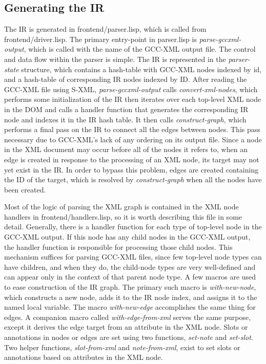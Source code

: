 \documentclass[12pt]{article}
\begin{document}
\subsection{Generating the IR}
The IR is generated in frontend/parser.lisp, which is called from frontend/driver.lisp. The primary entry-point in parser.lisp is \emph{parse-gccxml-output}, which is called with the name of the GCC-XML output file. The control and data flow within the parser is simple. The IR is represented in the \emph{parser-state} structure, which contains a hash-table with GCC-XML nodes indexed by id, and a hash-table of corresponding IR nodes indexed by ID. After reading the GCC-XML file using S-XML, \emph{parse-gccxml-output} calls \emph{convert-xml-nodes}, which performs some initialization of the IR then iterates over each top-level XML node in the DOM and calls a handler function that generates the corresponding IR node and indexes it in the IR hash table. It then calls \emph{construct-graph}, which performs a final pass on the IR to connect all the edges between nodes. This pass necessary due to GCC-XML's lack of any ordering on its output file. Since a node in the XML document may occur before all of the nodes it refers to, when an edge is created in response to the processing of an XML node, its target may not yet exist in the IR. In order to bypass this problem, edges are created containing the ID of the target, which is resolved by \emph{construct-graph} when all the nodes have been created. 

Most of the logic of parsing the XML graph is contained in the XML node handlers in  frontend/handlers.lisp, so it is worth describing this file in some detail. Generally, there is a handler function for each type of top-level node in the GCC-XML output. If this node has any child nodes in the GCC-XML output, the handler function is responsible for processing those child nodes. This mechanism suffices for parsing GCC-XML files, since few top-level node types can have children, and when they do, the child-node types are very well-defined and can appear only in the context of that parent node type. A few macros are used to ease construction of the IR graph. The primary such macro is \emph{with-new-node}, which constructs a new node, adds it to the IR node index, and assigns it to the named local variable. The macro \emph{with-new-edge} accomplishes the same thing for edges. A companion macro called \emph{with-edge-from-xml} serves the same purpose, except it derives the edge target from an attribute in the XML node. Slots or annotations in nodes or edges are set using two functions, \emph{set-note} and \emph{set-slot}. Two helper functions, \emph{slot-from-xml} and \emph{note-from-xml}, exist to set slots or annotations based on attributes in the XML node.
\end{document}
